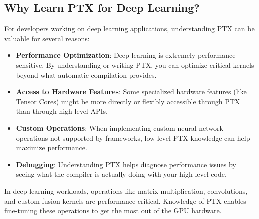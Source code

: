 \subsection{Why Learn PTX for Deep Learning?}

For developers working on deep learning applications, understanding PTX can be valuable for several reasons:

\begin{itemize}
    \item \textbf{Performance Optimization}: Deep learning is extremely performance-sensitive. By understanding or writing PTX, you can optimize critical kernels beyond what automatic compilation provides.
    
    \item \textbf{Access to Hardware Features}: Some specialized hardware features (like Tensor Cores) might be more directly or flexibly accessible through PTX than through high-level APIs.
    
    \item \textbf{Custom Operations}: When implementing custom neural network operations not supported by frameworks, low-level PTX knowledge can help maximize performance.
    
    \item \textbf{Debugging}: Understanding PTX helps diagnose performance issues by seeing what the compiler is actually doing with your high-level code.
\end{itemize}

In deep learning workloads, operations like matrix multiplication, convolutions, and custom fusion kernels are performance-critical. Knowledge of PTX enables fine-tuning these operations to get the most out of the GPU hardware.


